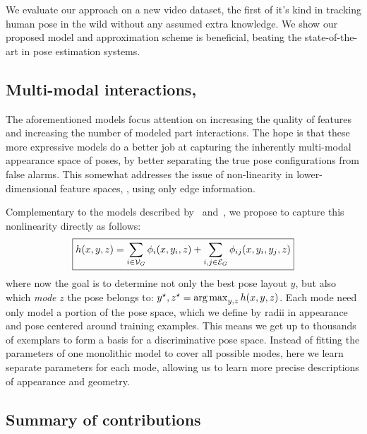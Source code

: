 We evaluate our approach on a new video dataset, the first of it's kind in 
tracking human pose in the wild without any assumed extra knowledge. We show 
our proposed model and approximation scheme is beneficial, beating the 
state-of-the-art in pose estimation systems.

\subsection{Multi-modal interactions,~}
\label{sec:contrib3}
The aforementioned models focus attention on increasing the quality of features 
and increasing the number of modeled part interactions.  The hope is that these 
more expressive models do a better job at capturing the inherently multi-modal 
appearance space of poses, by better separating the true pose configurations 
from false alarms.  This somewhat addresses the issue of non-linearity in 
lower-dimensional feature spaces, \eg, using only edge information.

Complementary to the models described by~ 
and~, we propose to capture this nonlinearity directly as 
follows:
\begin{equation}
\boxed{h(x,y,z) =  \sum_{i \in \mathcal{V}_{G}} \phi_i(x,y_i,z) + \sum_{i,j \in 
\mathcal{E}_{G}} \phi_{ij}(x,y_i,y_j,z)}
\label{eq:contrib3}
\end{equation}
where now the goal is to determine not only the best pose layout $y$, but also 
which {\em mode} $z$ the pose belongs to: $y^\star,z^\star = \mathop{\arg\max}_{y,z} 
h(x,y,z)$.  Each mode need only model a portion of the pose space, which we 
define by radii in appearance and pose centered around training examples.  This 
means we get up to thousands of exemplars to form a basis for a discriminative 
pose space.  Instead of fitting the parameters of one monolithic model to cover 
all possible modes, here we learn separate parameters for each mode, allowing 
us to learn more precise descriptions of appearance and geometry.

\subsection{Summary of contributions}

